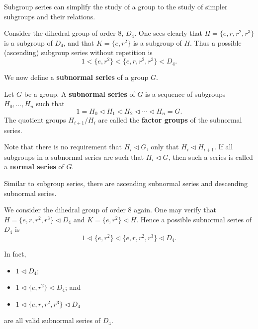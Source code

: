 Subgroup series can simplify the study of a group to the study of simpler subgroups and their relations.

\begin{example}
    Consider the dihedral group of order 8, $D_4$. One sees clearly that $H = \{e, r, r^2, r^3\}$ is a subgroup of $D_4$, and that $K = \{e, r^2\}$ is a subgroup of $H$. Thus a possible (ascending) subgroup series without repetition is
    \[
        1 < \{e, r^2\} < \{e, r, r^2, r^3\} < D_4.
    \]
\end{example}

We now define a \textbf{subnormal series} of a group $G$.
\begin{definition}
    Let $G$ be a group. A \textbf{subnormal series} of $G$ is a sequence of subgroups $H_0, \dots, H_n$ such that
    \[
        1 = H_0 \lhd H_1 \lhd H_2 \lhd \cdots \lhd H_n = G.    
    \]
    The quotient groups $H_{i+1}/H_i$ are called the \textbf{factor groups} of the subnormal series.
\end{definition}
\begin{remark}
    Note that there is no requirement that $H_i \lhd G$, only that $H_i \lhd H_{i+1}$. If all subgroups in a subnormal series are such that $H_i \lhd G$, then such a series is called a \textbf{normal series} of $G$.
\end{remark}
\begin{remark}
    Similar to subgroup series, there are ascending subnormal series and descending subnormal series.
\end{remark}

\begin{example}
    We consider the dihedral group of order 8 again. One may verify that $H = \{e, r, r^2, r^3\} \lhd D_4$ and $K = \{e, r^2\} \lhd H$. Hence a possible subnormal series of $D_4$ is
    \[
        1 \lhd \{e, r^2\} \lhd \{e, r, r^2, r^3\} \lhd D_4.
    \]

    \newpage

    In fact,
    \begin{itemize}
        \item $1 \lhd D_4$;
        \item $1 \lhd \{e, r^2\} \lhd D_4$; and
        \item $1 \lhd \{e, r, r^2, r^3\} \lhd D_4$
    \end{itemize}
    are all valid subnormal series of $D_4$.
\end{example}

